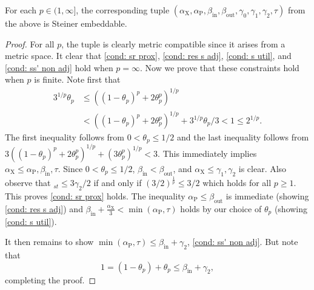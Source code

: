 \documentclass{article}\providecommand{\DeclareRedundantLanguages}[2]{}\usepackage[a4paper,margin=20mm]{geometry}
\newcommand{\1}{\textbf{1}}
\newcommand{\td}{\tau}
\newcommand{\pcoord}{\theta_p}
\newcommand{\srd}{\alpha_{\text{X}}}
\newcommand{\trd}{\alpha_{\text{P}}}
\begin{document}
\begin{proposition} \label{prop: l_p Steiner embed}
For each $p \in (1, \infty]$, the corresponding tuple $(\srd, \trd, \beta_{\text{in}}, \beta_{\text{out}}, \gamma_0, \gamma_1, \gamma_2, \td)$ from the above is Steiner embeddable.
\end{proposition}
\begin{proof}
For all $p$, the tuple is clearly metric compatible since it arises from a metric space. It clear that \ref{cond: sr prox}, \ref{cond: res s adj}, \ref{cond: s util}, and \ref{cond: ss' non adj} hold when $p = \infty$. Now we prove that these constraints hold when $p$ is finite. Note first 
that
\begin{align*}
3^{1/p}\pcoord &\leq ((1-\pcoord)^p + 2\pcoord^p)^{1/p} \\
&< ((1-\pcoord)^p + 2\pcoord^p)^{1/p} + 3^{1/p}\pcoord/3 < 1 \leq 2^{1/p}.
\end{align*}
The first inequality follows from $0 < \pcoord \leq 1/2$ and the last inequality follows from $3 ((1-\pcoord)^p + 2\pcoord^p)^{1/p} + (3\pcoord^p)^{1/p} < 3.$ This immediately implies $\srd \leq \trd, \beta_{\text{in}}, \td$. Since $0 < \pcoord \leq 1/2$, $\beta_{\text{in}} < \beta_{\text{out}}$, and $\srd \leq \gamma_1, \gamma_2$ is clear. Also observe that $_{st} \leq 3\gamma_2/2$ if and only if $(3/2)^{\frac{1}{p}} \leq 3/2$ which holds for all $p \geq 1$. This proves \ref{cond: sr prox} holds. The inequality $\trd \leq \beta_{\text{out}}$ is immediate (showing \ref{cond: res s adj}) and $\beta_{\text{in}} + \frac{\srd}{3} < \min(\trd, \td)$ holds by our choice of $\pcoord$ (showing \ref{cond: s util}). 

It then remains to show $\min(\trd, \td) \leq \beta_{\text{in}} + \gamma_2$, \ref{cond: ss' non adj}. But note that 
\[
1 = (1 - \pcoord) + \pcoord \leq \beta_{\text{in}} + \gamma_2,
\]
completing the proof.
\end{proof}
\end{document}
